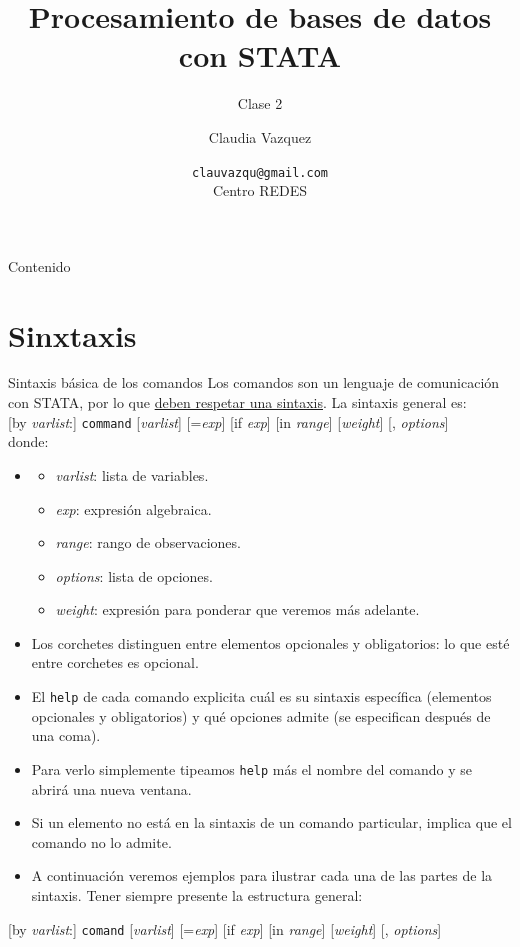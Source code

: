\documentclass{beamer}
\title[Clase 2]{Procesamiento de bases de datos con STATA}
\subtitle{Clase 2}
\author{Claudia Vazquez}
\date[]{\texttt{clauvazqu@gmail.com}\\Centro REDES}
\begin{document}
\begin{frame}
  \titlepage
\end{frame}

\begin{frame}{Contenido}
  \tableofcontents
 \end{frame}

\section{Sinxtaxis}

\begin{frame}[allowframebreaks]{Sintaxis básica de los comandos}
Los comandos son un lenguaje de comunicación con STATA, por lo que \underline{deben respetar una sintaxis}. La sintaxis general es:\\
\medskip
{\footnotesize [by \textit{varlist}:] \texttt{command} [\textit{varlist}] [=\textit{exp}] [if \textit{exp}] [in \textit{range}] [\textit{weight}] [, \textit{options}]}\\
\medskip
donde:
\begin{itemize}
\item 
\begin{itemize}
\item \textit{varlist}: lista de variables.
\item \textit{exp}: expresión algebraica.
\item \textit{range}: rango de observaciones. 
\item \textit{options}: lista de opciones. 
\item \textit{weight}: expresión para ponderar que veremos más adelante.
\end{itemize}
\item Los corchetes distinguen entre elementos opcionales y obligatorios: lo que esté entre corchetes es opcional.
\item El \texttt{help} de cada comando explicita cuál es su sintaxis específica (elementos opcionales y obligatorios) y qué opciones admite (se especifican después de una coma). 
\item Para verlo simplemente tipeamos \texttt{help} más el nombre del comando y se abrirá una nueva ventana.
\item Si un elemento no está en la sintaxis de un comando particular, implica que el comando no lo admite.
\item A continuación veremos ejemplos para ilustrar cada una de las partes de la sintaxis. Tener siempre presente la estructura general:
\end{itemize}
{\footnotesize [by \textit{varlist}:] \texttt{comand} [\textit{varlist}] [=\textit{exp}] [if \textit{exp}] [in \textit{range}] [\textit{weight}] [, \textit{options}]}
\end{frame}
\end{document}
